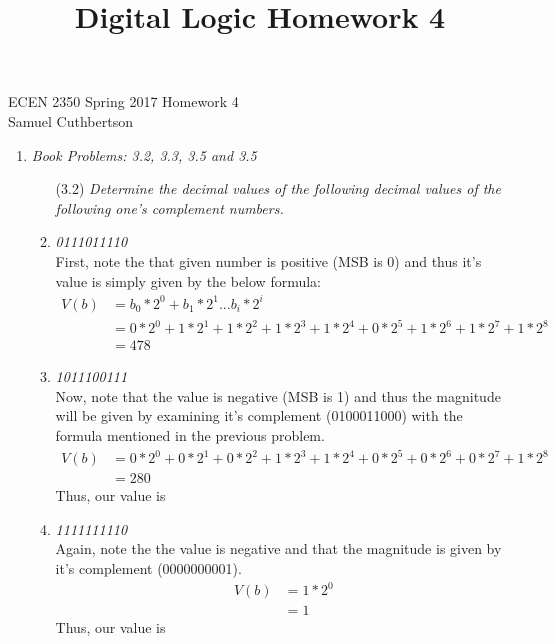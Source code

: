 \documentclass[12pt]{article}
\begin{document}
\title{Digital Logic Homework 4}

ECEN 2350 Spring 2017 \hfill Homework 4\\
Samuel Cuthbertson

\hrulefill

\begin{enumerate}
	\vspace{-4mm}
	\item \textit{Book Problems: 3.2, 3.3, 3.5 and 3.5}
	      \begin{enumerate}

	      	\item[(3.2)] \textit{Determine the decimal values of the following decimal values of the following one's complement numbers.}
	      	  \item \textit{0111011110} \\
	      	      First, note the that given number is positive (MSB is 0) and thus it's value is simply given by the below formula:
	      	      \begin{align*}
	      	      	V(b) &= b_0 * 2^0 + b_1 * 2^1 ... b_i * 2^i \\
                       &= 0*2^0 + 1*2^1 + 1*2^2 + 1*2^3 + 1*2^4 + 0*2^5 + 1*2^6 + 1*2^7 + 1*2^8 \\
                       &= \boxed{478}
	      	      \end{align*}

	         \item \textit{1011100111} \\
                Now, note that the value is negative (MSB is 1) and thus the magnitude will be given by examining it's complement (0100011000) with the formula mentioned in the previous problem.
                \begin{align*}
                  V(b) &= 0*2^0 + 0*2^1 + 0*2^2 + 1*2^3 + 1*2^4 + 0*2^5 + 0*2^6 + 0*2^7 + 1*2^8 \\
                       &= 280
                \end{align*}
                Thus, our value is 
	      	  \item \textit{1111111110} \\
                Again, note the the value is negative and that the magnitude is given by it's complement (0000000001).
                \begin{align*}
                  V(b) &= 1*2^0 \\
                       &= 1
                \end{align*}
                Thus, our value is 


\end{enumerate}
\end{enumerate}
\end{document}
